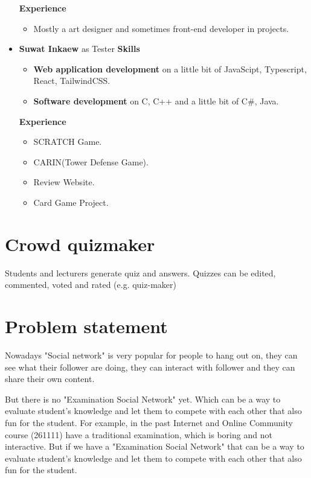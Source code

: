 \documentclass[ 10pt]{report}
\begin{document}
\begin{itemize}
                \textbf{Experience}
                \begin{itemize}
                    \item Mostly a art designer and sometimes front-end developer in projects. 
                \end{itemize}

            \item \textbf{Suwat Inkaew} as Tester
            \textbf{Skills}
                \begin{itemize}
                    \item \textbf{Web application development} on a little bit of JavaScipt, Typescript, React, TailwindCSS.
                    \item \textbf{Software development} on C, C++ and a little bit of C\#, Java.
                \end{itemize}
                
                \textbf{Experience}
                \begin{itemize}
                    \item SCRATCH Game.
                    \item CARIN(Tower Defense Game).
                    \item Review Website.
                    \item Card Game Project.
                \end{itemize}

        \end{itemize}

    \pagebreak
    \section{Crowd quizmaker}
    Students and lecturers generate quiz and answers. Quizzes can be edited, commented, voted and rated (e.g. quiz-maker)

    \section{Problem statement}
    
    Nowadays "Social network" is very popular for people to hang out on, they can see what their follower are doing, they can interact with follower and they can share their own content.

    But there is no "Examination Social Network" yet. Which can be a way to evaluate student's knowledge and let them to compete with each other that also fun for the student. For example, in the past Internet and Online Community course (261111) have a traditional examination, which is boring and not interactive. But if we have a "Examination Social Network" that can be a way to evaluate student's knowledge and let them to compete with each other that also fun for the student.
    
\end{document}
